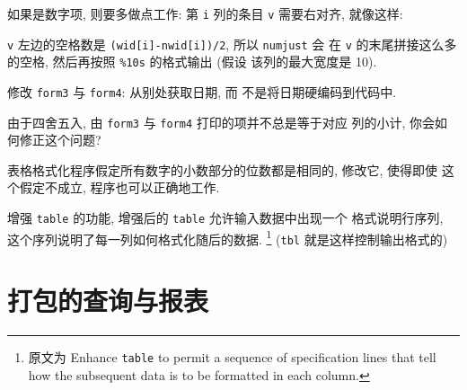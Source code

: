 如果是数字项, 则要多做点工作: 第 \verb'i' 列的条目 \verb'v' 需要右对齐,
就像这样:
\begin{center}
\end{center}
\verb'v' 左边的空格数是 \verb'(wid[i]-nwid[i])/2', 所以 \verb'numjust' 会
在 \verb'v' 的末尾拼接这么多的空格, 然后再按照 \verb'%10s' 的格式输出 (假设
该列的最大宽度是 10).

\begin{exercise}
    \label{exer:form3_form4}
    修改 \verb'form3' 与 \verb'form4': 从别处获取日期, 而
    不是将日期硬编码到代码中.
\end{exercise}

\begin{exercise}
    由于四舍五入, 由 \verb'form3' 与 \verb'form4' 打印的项并不总是等于对应
    列的小计, 你会如何修正这个问题?
\end{exercise}

\begin{exercise}
    \label{exer:table_format}
    表格格式化程序假定所有数字的小数部分的位数都是相同的, 修改它, 使得即使 
    这个假定不成立, 程序也可以正确地工作.
\end{exercise}

\begin{exercise}
    增强 \verb'table' 的功能, 增强后的 \verb'table' 允许输入数据中出现一个
    格式说明行序列, 这个序列说明了每一列如何格式化随后的数据.
    \footnote{原文为
        Enhance \texttt{table} to permit a sequence of specification lines
        that tell how the subsequent data is to be formatted in each column.
    } (\texttt{tbl} 就是这样控制输出格式的)
\end{exercise}

\section{打包的查询与报表}
\label{sec:packaged_queries_and_reports}

